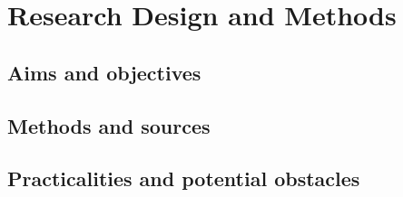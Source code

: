 \chapter{Research Design and Methods}%
\label{ch:methodology}

\section{Aims and objectives}
\section{Methods and sources}
\section{Practicalities and potential obstacles}